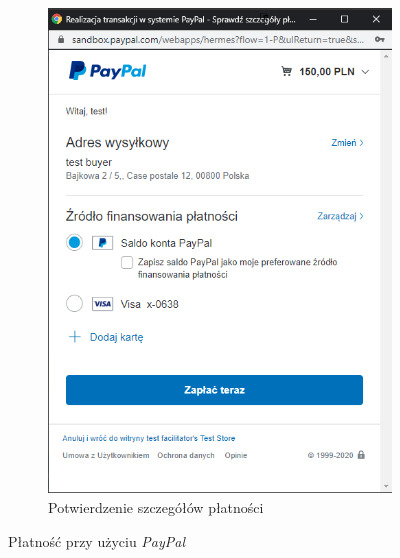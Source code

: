 \documentclass[12pt]{article}
\numberwithin{figure}{section}
\begin{document}
\begin{sloppypar}
\begin{figure}[h]
\begin{subfigure}{.5\textwidth}
      \includegraphics[width=.90\linewidth]{images/chapter_4/pay2.png}
      \caption{Potwierdzenie szczegółów płatności}
      \label{fig:paypal2}
    \end{subfigure}
    \caption{Płatność przy użyciu \textit{PayPal}}
    \label{fig:paypal}
\end{figure}


\end{sloppypar}
\end{document}
